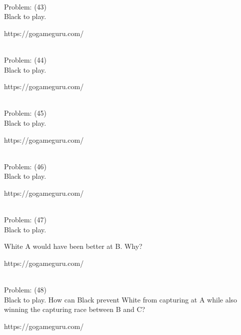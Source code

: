 \documentclass[11pt]{article}
\begin{document}
\begin{minipage}[t]{0.5\textwidth}
  {\centering
  
\\
  Problem: (43)\\
  Black to play.

https://gogameguru.com/\\
  }
\end{minipage}
\begin{minipage}[t]{0.5\textwidth}
  {\centering
  
\\
  Problem: (44)\\
  Black to play.

https://gogameguru.com/\\
  }
\end{minipage}
\begin{minipage}[t]{0.5\textwidth}
  {\centering
  
\\
  Problem: (45)\\
  Black to play.

https://gogameguru.com/\\
  }
\end{minipage}
\begin{minipage}[t]{0.5\textwidth}
  {\centering
  
\\
  Problem: (46)\\
  Black to play.

https://gogameguru.com/\\
  }
\end{minipage}
\begin{minipage}[t]{0.5\textwidth}
  {\centering
  
\\
  Problem: (47)\\
  Black to play.

White A would have been better at B. Why?

https://gogameguru.com/\\
  }
\end{minipage}
\begin{minipage}[t]{0.5\textwidth}
  {\centering
  
\\
  Problem: (48)\\
  Black to play. How can Black prevent White from capturing at A while also winning the capturing race between B and C?

https://gogameguru.com/\\
  }
\end{minipage}
\end{document}
